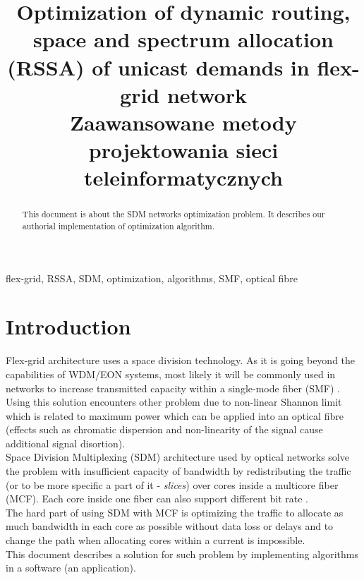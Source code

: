 \documentclass[conference]{IEEEtran}
\begin{document}
\title{Optimization of dynamic routing, space and spectrum allocation
(RSSA) of unicast demands in flex-grid network\\
{\footnotesize \textsuperscript{} Zaawansowane metody projektowania sieci teleinformatycznych}
}

\author{
\and
{}
}

\maketitle

\begin{abstract}
This document is about the SDM networks optimization problem. It describes our authorial implementation of optimization algorithm. 
\end{abstract}

\begin{IEEEkeywords}
flex-grid, RSSA, SDM, optimization, algorithms, SMF, optical fibre
\end{IEEEkeywords}

\section{Introduction}
Flex-grid architecture uses a space division technology. As it is going beyond the capabilities of WDM/EON systems, most likely it will be commonly used in networks to increase transmitted capacity within a single-mode fiber (SMF) \cite{sdm-walko}. Using this solution encounters other problem due to non-linear Shannon limit which is related to maximum power which can be applied into an optical fibre (effects such as chromatic dispersion and non-linearity of the signal cause additional signal disortion)\cite{shannon}.
\\
Space Division Multiplexing (SDM) architecture used by optical networks solve the problem with insufficient capacity of bandwidth by redistributing the traffic (or to be more specific a part of it - \textit{slices}) over cores inside a multicore fiber (MCF). Each core inside one fiber can also support different bit rate \cite{flex-intro}.
\\
The hard part of using SDM with MCF is optimizing the traffic to allocate as much bandwidth in each core as possible without data loss or delays and to change the path when allocating cores within a current is impossible.
\\
This document describes a solution for such problem by implementing algorithms in a software (an application).
\\
\end{document}
